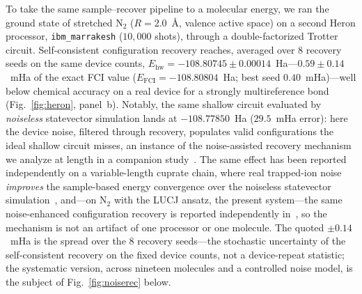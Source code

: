 To take the same sample--recover pipeline to a molecular energy, we ran the ground state of stretched
$\mathrm{N_2}$ ($R=2.0$~\AA, valence active space) on a second Heron processor,
\texttt{ibm\_marrakesh} ($10{,}000$ shots), through a double-factorized Trotter circuit. Self-consistent
configuration recovery reaches, averaged over $8$ recovery seeds on the same device counts,
$E_{\mathrm{hw}}=-108.80745\pm0.00014$~Ha---$0.59\pm0.14$~mHa of the exact FCI value
($E_{\mathrm{FCI}}=-108.80804$~Ha; best seed $0.40$~mHa)---well below chemical accuracy on a real device
for a strongly multireference bond (Fig.~\ref{fig:heron}, panel~b). Notably, the same shallow circuit evaluated by \emph{noiseless} statevector
simulation lands at $-108.77850$~Ha ($29.5$~mHa error): here the device noise, filtered through recovery,
populates valid configurations the ideal shallow circuit misses, an instance of the noise-assisted
recovery mechanism we analyze at length in a companion study~\cite{review}. The same effect has been
reported independently on a variable-length cuprate chain, where real trapped-ion noise \emph{improves}
the sample-based energy convergence over the noiseless statevector simulation~\cite{wray2025}, and---on
$\mathrm{N_2}$ with the LUCJ ansatz, the present system---the same noise-enhanced configuration recovery
is reported independently in~\cite{vaquero2026}, so the mechanism is not an artifact of one processor or
one molecule. The quoted $\pm0.14$~mHa is the spread over the $8$ recovery
seeds---the stochastic uncertainty of the self-consistent recovery on the fixed device counts, not a
device-repeat statistic; the systematic version, across nineteen molecules and a controlled noise model, is the subject of
Fig.~\ref{fig:noiserec} below.

